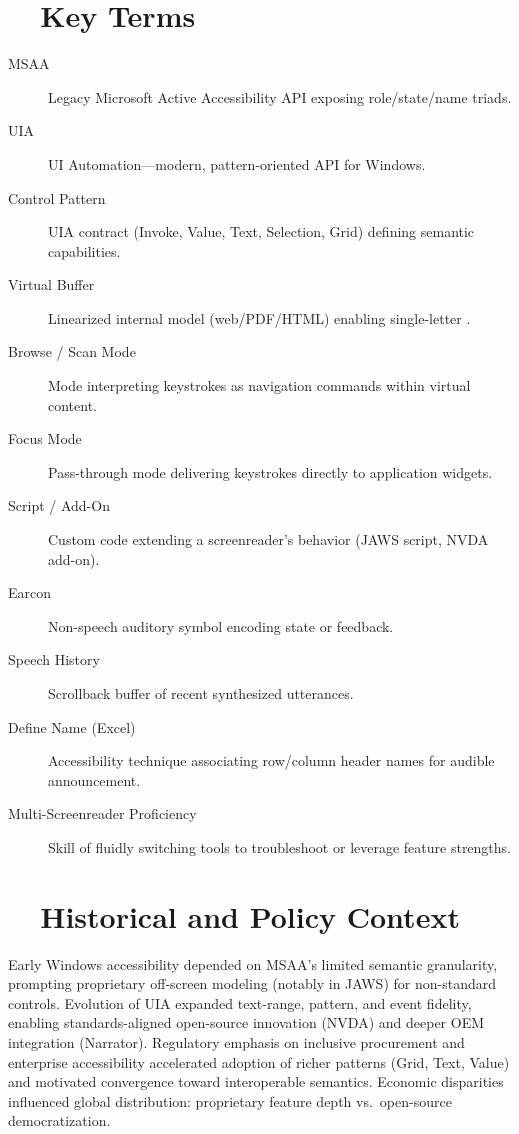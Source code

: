 \section{~~Key Terms}
\label{sec:sr25-key-terms}
\begin{description}
	\item[MSAA] Legacy Microsoft Active Accessibility API exposing role/state/name triads.
	\item[UIA] UI Automation—modern, pattern-oriented  API for Windows.
	\item[Control Pattern] UIA contract (Invoke, Value, Text, Selection, Grid) defining semantic capabilities.
	\item[Virtual Buffer] Linearized internal model (web/PDF/HTML) enabling single-letter .
	\item[Browse / Scan Mode] Mode interpreting keystrokes as navigation commands within virtual content.
	\item[Focus Mode] Pass-through mode delivering keystrokes directly to application widgets.
	\item[Script / Add-On] Custom code extending a screenreader’s behavior (JAWS script, NVDA add-on).
	\item[Earcon] Non-speech auditory symbol encoding state or feedback.
	\item[Speech History] Scrollback buffer of recent synthesized utterances.
	\item[Define Name (Excel)] Accessibility technique associating row/column header names for audible announcement.
	\item[Multi-Screenreader Proficiency] Skill of fluidly switching tools to troubleshoot or leverage feature strengths.
\end{description}

\section{~~Historical and Policy Context}
\label{sec:sr25-history}
Early Windows accessibility depended on MSAA’s limited semantic granularity, prompting proprietary off‑screen modeling (notably in JAWS) for non-standard controls. Evolution of UIA expanded text-range, pattern, and event fidelity, enabling standards-aligned open-source innovation (NVDA) and deeper OEM integration (Narrator). Regulatory emphasis on inclusive procurement and enterprise accessibility accelerated adoption of richer patterns (Grid, Text, Value) and motivated convergence toward interoperable semantics. Economic disparities influenced global distribution: proprietary feature depth vs.\ open-source democratization.

